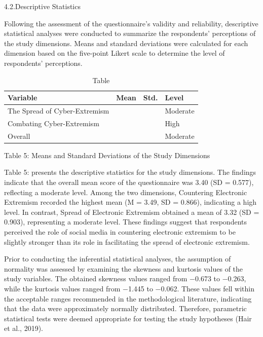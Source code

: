\documentclass{NSP1}
\begin{document}
4.2.Descriptive Statistics

Following the assessment of the questionnaire's validity and reliability, descriptive statistical analyses were conducted to summarize the respondents' perceptions of the study dimensions. Means and standard deviations were calculated for each dimension based on the five-point Likert scale to determine the level of respondents' perceptions.

\begin{table}[tbp]
\centering
{\small
\begin{tabular}{|p{}|>{\centering\arraybackslash}p{}|>{\centering\arraybackslash}p{}|>{\centering\arraybackslash}p{}|}
\hline
\cellcolor[HTML]{DDD9C3}\textbf{Variable} & \cellcolor[HTML]{DDD9C3}\textbf{Mean} & \cellcolor[HTML]{DDD9C3}\textbf{Std.} & \cellcolor[HTML]{DDD9C3}\textbf{Level} \\
\hline
\cellcolor[HTML]{DDD9C3}The Spread of Cyber-Extremism & 3.32 & 0.903 & Moderate \\
\hline
\cellcolor[HTML]{DDD9C3}Combating Cyber-Extremism & 3.49 & 0.866 & High \\
\hline
\cellcolor[HTML]{DDD9C3}Overall & 3.40 & 0.577 & Moderate \\
\hline
\end{tabular}}
\caption{Table}

\end{table}

Table 5: Means and Standard Deviations of the Study Dimensions

Table 5: presents the descriptive statistics for the study dimensions. The findings indicate that the overall mean score of the questionnaire was 3.40 (SD = 0.577), reflecting a moderate level. Among the two dimensions, Countering Electronic Extremism recorded the highest mean (M = 3.49, SD = 0.866), indicating a high level. In contrast, Spread of Electronic Extremism obtained a mean of 3.32 (SD = 0.903), representing a moderate level. These findings suggest that respondents perceived the role of social media in countering electronic extremism to be slightly stronger than its role in facilitating the spread of electronic extremism.

Prior to conducting the inferential statistical analyses, the assumption of normality was assessed by examining the skewness and kurtosis values of the study variables. The obtained skewness values ranged from −0.673 to −0.263, while the kurtosis values ranged from −1.445 to −0.062. These values fell within the acceptable ranges recommended in the methodological literature, indicating that the data were approximately normally distributed. Therefore, parametric statistical tests were deemed appropriate for testing the study hypotheses (Hair et al., 2019).
\end{document}
